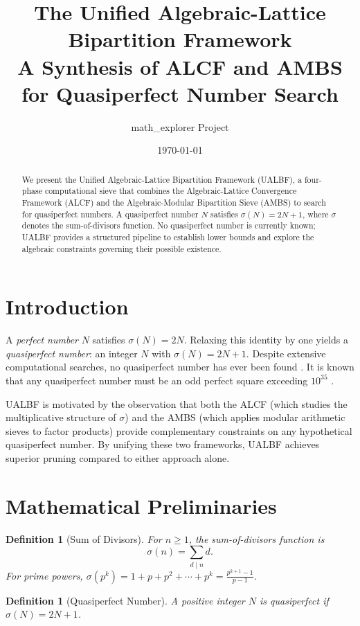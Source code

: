 \documentclass[12pt]{article}
\title{The Unified Algebraic-Lattice Bipartition Framework\\
\large A Synthesis of ALCF and AMBS for Quasiperfect Number Search}
\author{math\_explorer Project}
\date{\today}
\newtheorem{definition}[theorem]{Definition}
\begin{document}
\maketitle

\begin{abstract}
We present the Unified Algebraic-Lattice Bipartition Framework (UALBF), a
four-phase computational sieve that combines the Algebraic-Lattice Convergence
Framework (ALCF) and the Algebraic-Modular Bipartition Sieve (AMBS) to search
for quasiperfect numbers. A quasiperfect number $N$ satisfies $\sigma(N) = 2N+1$,
where $\sigma$ denotes the sum-of-divisors function. No quasiperfect number is
currently known; UALBF provides a structured pipeline to establish lower bounds
and explore the algebraic constraints governing their possible existence.
\end{abstract}

\section{Introduction}

A \emph{perfect number} $N$ satisfies $\sigma(N) = 2N$. Relaxing this identity
by one yields a \emph{quasiperfect number}: an integer $N$ with $\sigma(N) = 2N+1$.
Despite extensive computational searches, no quasiperfect number has ever been
found \cite{Guy2004}. It is known that any quasiperfect number must be an odd
perfect square exceeding $10^{35}$ \cite{CohenHagis1982}.

UALBF is motivated by the observation that both the ALCF (which studies the
multiplicative structure of $\sigma$) and the AMBS (which applies modular
arithmetic sieves to factor products) provide complementary constraints on any
hypothetical quasiperfect number. By unifying these two frameworks, UALBF
achieves superior pruning compared to either approach alone.

\section{Mathematical Preliminaries}

\begin{definition}[Sum of Divisors]
For $n \geq 1$, the \emph{sum-of-divisors function} is
\[
    \sigma(n) = \sum_{d \mid n} d.
\]
For prime powers, $\sigma(p^k) = 1 + p + p^2 + \cdots + p^k = \frac{p^{k+1}-1}{p-1}$.
\end{definition}

\begin{definition}[Quasiperfect Number]
A positive integer $N$ is \emph{quasiperfect} if $\sigma(N) = 2N + 1$.
\end{definition}
\end{document}
